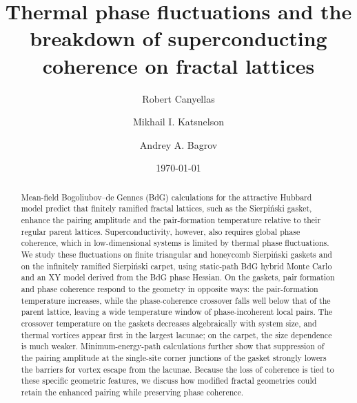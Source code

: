 \documentclass[aps,prb,twocolumn,superscriptaddress,floatfix]{revtex4-2}
\begin{document}
\title{Thermal phase fluctuations and the breakdown of superconducting coherence on fractal lattices}

\author{Robert Canyellas}

\author{Mikhail I. Katsnelson}

\author{Andrey A. Bagrov}

\date{\today}

\begin{abstract}
Mean-field Bogoliubov--de Gennes (BdG) calculations for the attractive Hubbard
model predict that finitely ramified fractal lattices, such as the
Sierpi\'nski gasket, enhance the pairing amplitude and the pair-formation
temperature relative to their regular parent lattices. Superconductivity,
however, also requires global phase coherence, which in low-dimensional
systems is limited by thermal phase fluctuations. We study these fluctuations
on finite triangular and honeycomb Sierpi\'nski gaskets and on the infinitely
ramified Sierpi\'nski carpet, using static-path BdG hybrid Monte Carlo and an
XY model derived from the BdG phase Hessian. On the gaskets, pair formation
and phase coherence respond to the geometry in opposite ways: the
pair-formation temperature increases, while the phase-coherence crossover
falls well below that of the parent lattice, leaving a wide temperature window
of phase-incoherent local pairs. The crossover
temperature on the gaskets decreases algebraically with system size, and
thermal vortices appear first in the largest lacunae; on the carpet, the size
dependence is much weaker. Minimum-energy-path calculations further show that
suppression of the pairing amplitude at the single-site corner junctions of
the gasket strongly lowers the barriers for vortex escape from the lacunae.
Because the loss of coherence is tied to these specific geometric features,
we discuss how modified fractal geometries could retain the enhanced pairing
while preserving phase coherence.
\end{abstract}

\maketitle
\end{document}
